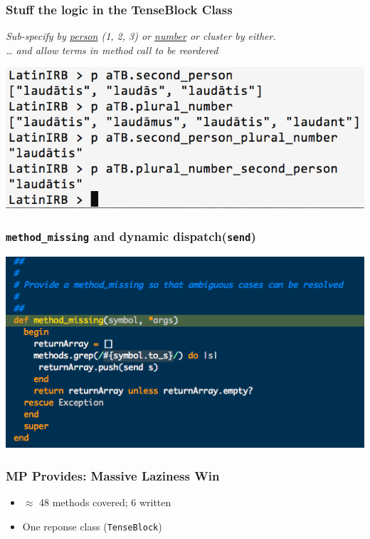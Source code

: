 \documentclass[slidestop,compress,mathserif]{beamer}
\begin{document}
\begin{frame}
	\frametitle{Stuff the logic in the TenseBlock Class}
	\emph{
		Sub-specify by \underline{person} (1, 2, 3) or \underline{number} or
    cluster by either. \\
		\pause
		{\ldots} and allow terms in method call to be reordered
  }
	\vskip 0.5cm
	\begin{center}
		\includegraphics[scale=0.38]{img/conj_subspec.png}
	\end{center}
\end{frame}

\begin{frame}
	\frametitle{\texttt{method\_missing} and dynamic dispatch(\texttt{send})}
	\includegraphics[scale=0.55]{img/tenseblock_mm.png}
\end{frame}

\begin{frame}
	\frametitle{MP Provides:  Massive Laziness Win}
	\begin{itemize}
		\item $\approx$ 48 methods covered; 6 written
		\pause
		\item One reponse class (\texttt{TenseBlock})
	\end{itemize}
\end{frame}
\end{document}
